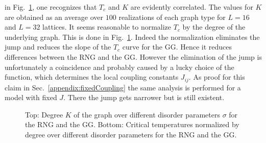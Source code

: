         in Fig.\ \ref{fig:Tc_deg},
        one recognizes that \(T_c\) and \(K\) are evidently correlated.
        The values for \(K\) are obtained as an average over \(100\)
        realizations of each graph type for \(L=16\) and \(L=32\) lattices.
        It seems reasonable to normalize \(T_c\) by the degree of the underlying
        graph. This is done in Fig.\ \ref{fig:Tc_deg}.
        Indeed the normalization eliminates the jump and reduces the
        slope of the \(T_c\) curve for the GG. Hence it reduces differences
        between the RNG and the GG. However the elimination of the jump is
        unfortunately a coincidence and probably caused by a lucky choice of the
        function, which determines the local coupling constants \(J_{ij}\). As proof for
        this claim in Sec.\ \ref{appendix:fixedCoupling} the same analysis
        is performed for a model with fixed \(J\). There the jump gets narrower
        but is still existent.\\
        \begin{figure}[htbp]
            \centering


            \caption[Critical Temperature Normalized by Degree of the Graph]
            {
                Top: Degree \(K\) of the graph over different
                disorder parameters \(\sigma\) for
                 the RNG and
                 the GG.
                Bottom: Critical temperatures normalized by degree over different
                disorder parameters for
                 the RNG and
                 the GG.
            }
            \label{fig:Tc_deg}
        \end{figure}\\
